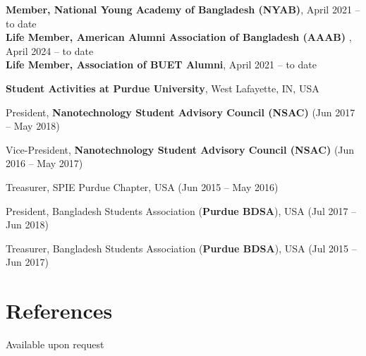 \documentclass[cvauthor={Dr. Sajid Muhaimin Choudhury}]{buetcv}
\begin{document}
            \begin{onecolentry}
                \textbf{Member, National Young Academy of Bangladesh (NYAB)}, April 2021 – to date    \\     
                \textbf{Life Member, American Alumni Association of Bangladesh (AAAB)	}, April 2024 – to date    
                \\                    
                \textbf{Life Member, Association of BUET Alumni}, April 2021 – to date    \\     

        \end{onecolentry} 
        \begin{onecolentry}
            \textbf{Student Activities at Purdue University}, West Lafayette, IN, USA
            \begin{highlights}
                \item President, \textbf{Nanotechnology Student Advisory Council (NSAC)}	(Jun 2017 – May 2018)
                \item Vice-President, \textbf{Nanotechnology Student Advisory Council (NSAC)}	(Jun 2016 – May 2017)
                \item Treasurer, SPIE Purdue Chapter, USA (Jun 2015 – May 2016)
                \item President, Bangladesh Students Association (\textbf{Purdue BDSA}), USA  (Jul 2017 – Jun 2018)
                \item Treasurer, Bangladesh Students Association (\textbf{Purdue BDSA}), USA  (Jul 2015 – Jun 2017)
            \end{highlights}
        \end{onecolentry} 

        \vspace{0.2 cm}
    
\section{References}

Available upon request

    
\end{document}
